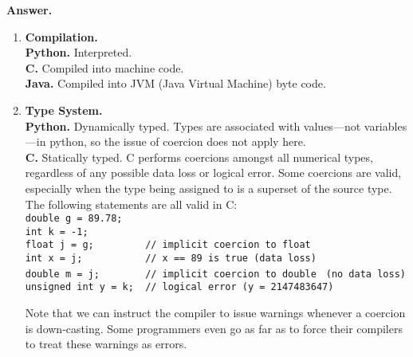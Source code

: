 \documentclass[9pt]{article}
\begin{document}
\begin{enumerate}
      \textbf{Answer.}

      \begin{enumerate}
         \item \textbf{Compilation.} \\
         
               \textbf{Python.} Interpreted. \\
               
               \textbf{C.} Compiled into machine code. \\
               
               \textbf{Java.} Compiled into JVM (Java Virtual Machine) byte
               code.
         \item \textbf{Type System.} \\
         
               \textbf{Python.} Dynamically typed. Types are associated with
               values---not variables---in python, so the issue of coercion does
               not apply here. \\
               
               \textbf{C.} Statically typed. C performs coercions amongst all
               numerical types, regardless of any possible data loss or logical
               error. Some coercions are valid, especially when the type being
               assigned to is a superset of the source type. The following
               statements are all valid in C: \\
               
               \verb|double g = 89.78;| \\
               \verb|int k = -1;| \\
               \verb|float j = g;         // implicit coercion to float | \\
               \verb|int x = j;           // x == 89 is true (data loss) | \\
               \verb|double m = j;        // implicit coercion to double|
               \verb| (no data loss)| \\
               \verb|unsigned int y = k;  // logical error (y = 2147483647)|
               
               Note that we can instruct the compiler to issue warnings whenever
               a coercion is down-casting. Some programmers even go as far as to
               force their compilers to treat these warnings as errors. \\
               

\end{enumerate}
\end{enumerate}
\end{document}
